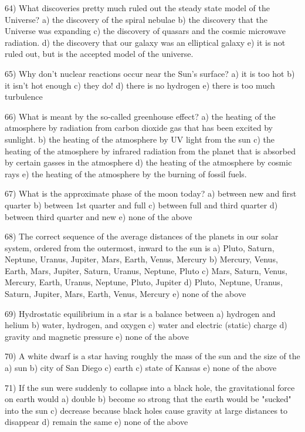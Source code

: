 64) What discoveries pretty much ruled out the steady state model of the
Universe?
a) the discovery of the spiral nebulae
b) the discovery that the Universe was expanding
c) the discovery of quasars and the cosmic microwave radiation.
d) the discovery that our galaxy was an elliptical galaxy
e) it is not ruled out, but is the accepted model of the universe.

65) Why don't nuclear reactions occur near the Sun's surface?
a) it is too hot b) it isn't hot enough c) they do!
d) there is no hydrogen e) there is too much turbulence

66) What is meant by the so-called greenhouse effect?
a) the heating of the atmosphere by radiation from carbon dioxide
gas that has been excited by sunlight.
b) the heating of the atmosphere by UV light from the sun
c) the heating of the atmosphere by infrared radiation from the
planet that is absorbed by certain gasses in the atmosphere
d) the heating of the atmosphere by cosmic rays
e) the heating of the atmosphere by the burning of fossil fuels.

67) What is the approximate phase of the moon today?
a) between new and first quarter
b) between 1st quarter and full
c) between full and third quarter
d) between third quarter and new
e) none of the above

68) The correct sequence of the average distances of the planets in our solar
system, ordered from the outermost, inward to the sun is
a) Pluto, Saturn, Neptune, Uranus, Jupiter, Mars, Earth, Venus, Mercury
b) Mercury, Venus, Earth, Mars, Jupiter, Saturn, Uranus, Neptune, Pluto
c) Mars, Saturn, Venus, Mercury, Earth, Uranus, Neptune, Pluto, Jupiter
d) Pluto, Neptune, Uranus, Saturn, Jupiter, Mars, Earth, Venus, Mercury
e) none of the above

69) Hydrostatic equilibrium in a star is a balance between
a) hydrogen and helium
b) water, hydrogen, and oxygen
c) water and electric (static) charge
d) gravity and magnetic pressure
e) none of the above

70) A white dwarf is a star having roughly the mass of the sun
and the size of the
a) sun b) city of San Diego c) earth c) state of Kansas
e) none of the above

71) If the sun were suddenly to collapse into a black hole,
the gravitational force on earth would
a) double
b) become so strong that the earth would be "sucked" into the sun
c) decrease because black holes cause gravity at large distances
to disappear
d) remain the same
e) none of the above

